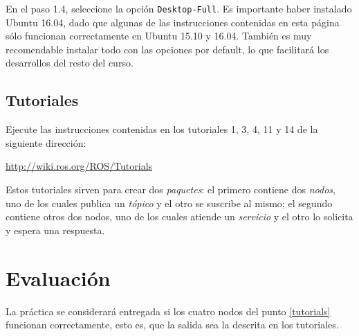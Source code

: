 \documentclass[letterpaper,12pt]{article}
\begin{document}
En el paso 1.4, seleccione la opción \texttt{Desktop-Full}. Es importante haber instalado Ubuntu 16.04, dado que algunas de las instrucciones contenidas en esta página sólo funcionan correctamente en Ubuntu 15.10 y 16.04. También es muy recomendable instalar todo con las opciones por default, lo que facilitará los desarrollos del resto del curso. 

\subsection{Tutoriales\label{tutorials}}

Ejecute las instrucciones contenidas en los tutoriales 1, 3, 4, 11 y 14 de la siguiente dirección:

\url{http://wiki.ros.org/ROS/Tutorials}

Estos tutoriales sirven para crear dos \textit{paquetes}: el primero contiene dos \textit{nodos}, uno de los cuales publica un \textit{tópico} y el otro se suscribe al mismo; el segundo contiene otros dos nodos, uno de los cuales atiende un \textit{servicio} y el otro lo solicita y espera una respuesta. 

\section{Evaluación}

La práctica se considerará entregada si los cuatro nodos del punto \ref{tutorials} funcionan correctamente, esto es, que la salida sea la descrita en los tutoriales. 
\end{document}
